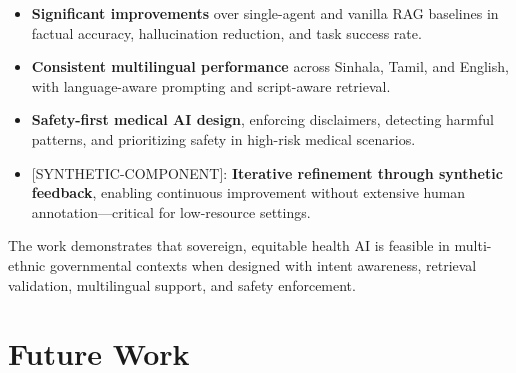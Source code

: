 \documentclass[11pt,a4paper]{article}
\newcommand{\synthetic}[1]{{\colorbox{syntheticcolor}{[SYNTHETIC-COMPONENT]: #1}}}
\begin{document}
\begin{itemize}
    \item \textbf{Significant improvements} over single-agent and vanilla RAG baselines in factual accuracy, hallucination reduction, and task success rate.
    
    \item \textbf{Consistent multilingual performance} across Sinhala, Tamil, and English, with language-aware prompting and script-aware retrieval.
    
    \item \textbf{Safety-first medical AI design}, enforcing disclaimers, detecting harmful patterns, and prioritizing safety in high-risk medical scenarios.
    
    \item \synthetic{
        \textbf{Iterative refinement through synthetic feedback}, enabling continuous improvement without extensive human annotation---critical for low-resource settings.
    }
\end{itemize}

The work demonstrates that sovereign, equitable health AI is feasible in multi-ethnic governmental contexts when designed with intent awareness, retrieval validation, multilingual support, and safety enforcement.

\section{Future Work}
\end{document}

